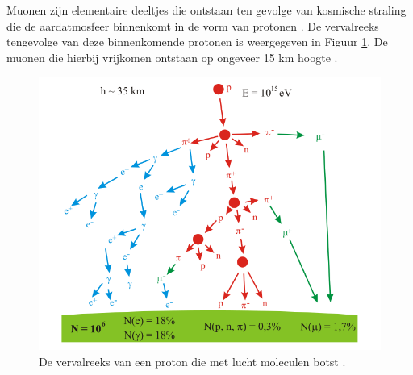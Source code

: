 Muonen zijn elementaire deeltjes die ontstaan ten gevolge van kosmische straling die de aardatmosfeer binnenkomt in de vorm van protonen \cite{bbnikhef}. De vervalreeks tengevolge van deze binnenkomende protonen is weergegeven in Figuur \ref{fig:air_shower}. De muonen die hierbij vrijkomen ontstaan op ongeveer 15 km hoogte  \cite{air_shower}.
\begin{figure}[!htbp]
\begin{center}
\includegraphics[width=\textwidth]{figuren/air_shower.png}
\end{center}
\caption{De vervalreeks van een proton die met lucht moleculen botst \cite{air_shower}.}\label{fig:air_shower}
\end{figure}

